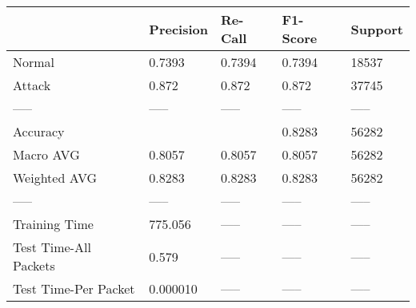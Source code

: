 \begin{tabular}{lllll}
\toprule
{} & Precision & Re-Call & F1-Score & Support \\
\midrule
Normal                &    0.7393 &  0.7394 &   0.7394 &   18537 \\
Attack                &     0.872 &   0.872 &    0.872 &   37745 \\
-----                 &     ----- &   ----- &    ----- &   ----- \\
Accuracy              &           &         &   0.8283 &   56282 \\
Macro AVG             &    0.8057 &  0.8057 &   0.8057 &   56282 \\
Weighted AVG          &    0.8283 &  0.8283 &   0.8283 &   56282 \\
-----                 &     ----- &   ----- &    ----- &   ----- \\
Training Time         &   775.056 &   ----- &    ----- &   ----- \\
Test Time-All Packets &     0.579 &   ----- &    ----- &   ----- \\
Test Time-Per Packet  &  0.000010 &   ----- &    ----- &   ----- \\
\bottomrule
\end{tabular}
